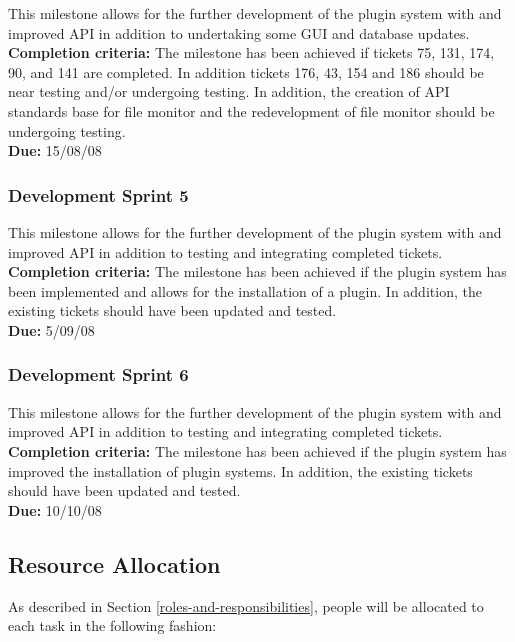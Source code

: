\documentclass{article}
\begin{document}
This milestone allows for the further development of the plugin system with and improved API in addition to undertaking some GUI and database updates. \\
\textbf{Completion criteria:} The milestone has been achieved if tickets 75, 131, 174, 90, and 141 are completed. In addition tickets 176, 43, 154 and 186 should be near testing and/or undergoing testing. In addition, the creation of API standards base for file monitor and the redevelopment of file monitor should be undergoing testing.
\\
\textbf{Due:} 15/08/08

\subsubsection{Development Sprint 5}

This milestone allows for the further development of the plugin system with and improved API in addition to testing and integrating completed tickets. \\
\textbf{Completion criteria:} The milestone has been achieved if the plugin system has been implemented and allows for the installation of a plugin. In addition, the existing tickets should have been updated and tested.
\\
\textbf{Due:} 5/09/08

\subsubsection{Development Sprint 6}

This milestone allows for the further development of the plugin system with and improved API in addition to testing and integrating completed tickets. \\
\textbf{Completion criteria:} The milestone has been achieved if the plugin system has improved the installation of plugin systems. In addition, the existing tickets should have been updated and tested.
\\
\textbf{Due:} 10/10/08

\subsection{Resource Allocation}

As described in Section \ref{roles-and-responsibilities}, people will be allocated to each task in the following fashion:
\end{document}
